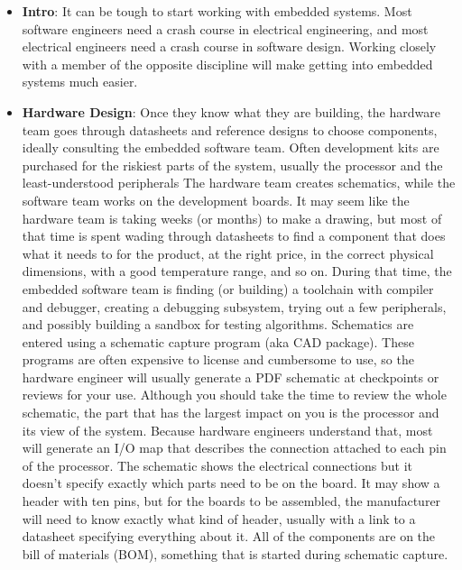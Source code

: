 \documentclass{report}
\begin{document}
    \pagebreak 
    \begin{itemize}
        \item \textbf{Intro}: It can be tough to start working with embedded systems. Most software engineers need a crash course in electrical engineering, and most electrical engineers need a crash course in software design. Working closely with a member of the opposite discipline will make getting into embedded systems much easier. 
        \item \textbf{Hardware Design}: Once they know what they are building, the hardware team goes through datasheets and reference designs to choose components, ideally consulting the embedded software team. Often development kits are purchased for the riskiest parts of the system, usually the processor and the least-understood peripherals 
            \bigbreak \noindent 
            The hardware team creates schematics, while the software team works on the development boards. It may seem like the hardware team is taking weeks (or months) to make a drawing, but most of that time is spent wading through datasheets to find a component that does what it needs to for the product, at the right price, in the correct physical dimensions, with a good temperature range, and so on. During that time, the embedded software team is finding (or building) a toolchain with compiler and debugger, creating a debugging subsystem, trying out a few peripherals, and possibly building a sandbox for testing algorithms. 
            \bigbreak \noindent 
            Schematics are entered using a schematic capture program (aka CAD package). These programs are often expensive to license and cumbersome to use, so the hardware engineer will usually generate a PDF schematic at checkpoints or reviews for your use. Although you should take the time to review the whole schematic, the part that has the largest impact on you is the processor and its view of the system. Because hardware engineers understand that, most will generate an I/O map that describes the connection attached to each pin of the processor. 
            \bigbreak \noindent 
            The schematic shows the electrical connections but it doesn’t specify exactly which parts need to be on the board. It may show a header with ten pins, but for the boards to be assembled, the manufacturer will need to know exactly what kind of header, usually with a link to a datasheet specifying everything about it. All of the components are on the bill of materials (BOM), something that is started during schematic capture.

\end{itemize}
\end{document}
